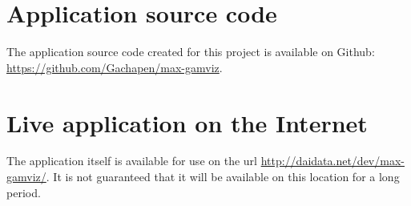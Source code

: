 \section{Application source code}
The application source code created for this project is available on Github: \url{https://github.com/Gachapen/max-gamviz}.

\section{Live application on the Internet}
The application itself is available for use on the url \url{http://daidata.net/dev/max-gamviz/}.
It is not guaranteed that it will be available on this location for a long period.
